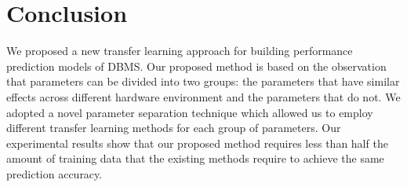 \section{Conclusion}
We proposed a new transfer learning approach for building performance prediction models of DBMS.
Our proposed method is based on the observation that parameters can be divided into two groups: the parameters that have similar effects across different hardware environment and the parameters that do not.
We adopted a novel parameter separation technique which allowed us to employ different transfer learning methods for each group of parameters.
Our experimental results show that our proposed method requires less than half the amount of training data that the existing methods require to achieve the same prediction accuracy.